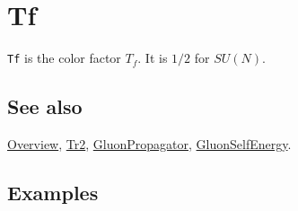 \documentclass[../FeynCalcManual.tex]{subfiles}
\begin{document}
\hypertarget{tf}{%
\section{Tf}\label{tf}}

\texttt{Tf} is the color factor \(T_f\). It is \(1/2\) for \(SU(N)\).

\subsection{See also}

\hyperlink{toc}{Overview}, \hyperlink{tr2}{Tr2},
\hyperlink{gluonpropagator}{GluonPropagator},
\hyperlink{gluonselfenergy}{GluonSelfEnergy}.

\subsection{Examples}
\end{document}
